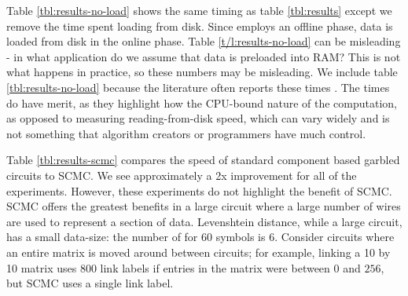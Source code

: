 Table \ref{tbl:results-no-load} shows the same timing as table \ref{tbl:results} except we remove the time spent loading from disk.
Since \CompGC employs an offline phase, data is loaded from disk in the online phase. 
Table \ref{t/l:results-no-load} can be misleading - in what application do we assume that data is preloaded into RAM?
This is not what happens in practice, so these numbers may be misleading.
We include table \ref{tbl:results-no-load} because the literature often reports these times \cite{blazing-fast}. 
The times do have merit, as they highlight how the CPU-bound nature of the computation, as opposed to measuring reading-from-disk speed, which can vary widely and is not something that algorithm creators or programmers have much control. 

Table \ref{tbl:results-scmc} compares the speed of standard component based garbled circuits to SCMC.
We see approximately a 2x improvement for all of the experiments. 
However, these experiments do not highlight the benefit of SCMC. 
SCMC offers the greatest benefits in a large circuit where a large number of wires are used to represent a section of data.
Levenshtein distance, while a large circuit, has a small data-size: the number of for 60 symbols is 6.
Consider circuits where an entire matrix is moved around between circuits; for example, linking a 10 by 10 matrix uses $800$ link labels if entries in the matrix were between $0$ and $256$, but SCMC uses a single link label.

\newpage



\newpage


